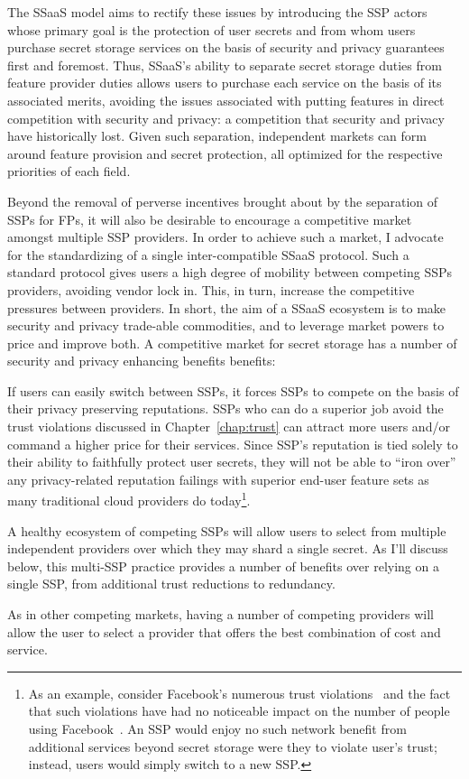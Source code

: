 The SSaaS model aims to rectify these issues by introducing the SSP
actors whose primary goal is the protection of user secrets and from
whom users purchase secret storage services on the basis of security
and privacy guarantees first and foremost. Thus, SSaaS's ability to
separate secret storage duties from feature provider duties allows
users to purchase each service on the basis of its associated merits,
avoiding the issues associated with putting features in direct
competition with security and privacy: a competition that security and
privacy have historically lost. Given such separation, independent
markets can form around feature provision and secret protection, all
optimized for the respective priorities of each field.

Beyond the removal of perverse incentives brought about by the
separation of SSPs for FPs, it will also be desirable to encourage a
competitive market amongst multiple SSP providers. In order to achieve
such a market, I advocate for the standardizing of a single
inter-compatible SSaaS protocol. Such a standard protocol gives users
a high degree of mobility between competing SSPs providers, avoiding
vendor lock in. This, in turn, increase the competitive pressures
between providers. In short, the aim of a SSaaS ecosystem is to make
security and privacy trade-able commodities, and to leverage market
powers to price and improve both. A competitive market for secret
storage has a number of security and privacy enhancing benefits
benefits:

\begin{packed_desc}
\item[Reputation] If users can easily switch between SSPs, it forces
  SSPs to compete on the basis of their privacy preserving
  reputations. SSPs who can do a superior job avoid the trust
  violations discussed in Chapter~\ref{chap:trust} can attract more
  users and/or command a higher price for their services. Since SSP's
  reputation is tied solely to their ability to faithfully protect
  user secrets, they will not be able to ``iron over'' any
  privacy-related reputation failings with superior end-user feature
  sets as many traditional cloud providers do today\footnote{As an
    example, consider Facebook's numerous trust
    violations~\cite{goel2014, lomas2014, tsukayama2014} and the fact
    that such violations have had no noticeable impact on the number
    of people using Facebook~\cite{foster2014}. An SSP would enjoy no
    such network benefit from additional services beyond secret
    storage were they to violate user's trust; instead, users would
    simply switch to a new SSP.}.
\item[Multiple Providers] A healthy ecosystem of competing SSPs will
  allow users to select from multiple independent providers over which
  they may shard a single secret. As I'll discuss below, this
  multi-SSP practice provides a number of benefits over relying on a
  single SSP, from additional trust reductions to redundancy.
\item[Cost] As in other competing markets, having a number of
  competing providers will allow the user to select a provider that
  offers the best combination of cost and service.
\end{packed_desc}

